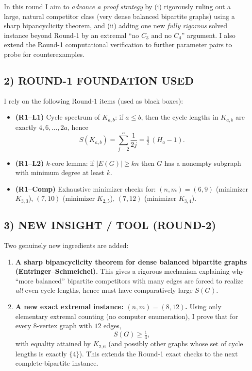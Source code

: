 In this round I aim to \emph{advance a proof strategy} by (i) rigorously ruling out a large, natural competitor class (very dense balanced bipartite graphs) using a sharp bipancyclicity theorem, and (ii) adding one new \emph{fully rigorous} solved instance beyond Round-1 by an extremal ``no $C_3$ and no $C_4$'' argument. I also extend the Round-1 computational verification to further parameter pairs to probe for counterexamples.

\subsection*{2) \textbf{ROUND-1 FOUNDATION USED}}
I rely on the following Round-1 items (used as black boxes):
\begin{itemize}
\item \textbf{(R1--L1)} Cycle spectrum of $K_{a,b}$: if $a\le b$, then the cycle lengths in $K_{a,b}$ are exactly $4,6,\dots,2a$, hence
\[S(K_{a,b})=\sum_{j=2}^{a}\frac{1}{2j}=\tfrac12\,(H_a-1).\]
\item \textbf{(R1--L2)} $k$-core lemma: if $|E(G)|\ge kn$ then $G$ has a nonempty subgraph with minimum degree at least $k$.
\item \textbf{(R1--Comp)} Exhaustive minimizer checks for:
$(n,m)=(6,9)$ (minimizer $K_{3,3}$), $(7,10)$ (minimizer $K_{2,5}$), $(7,12)$ (minimizer $K_{3,4}$).
\end{itemize}

\subsection*{3) \textbf{NEW INSIGHT / TOOL (ROUND-2)}}
Two genuinely new ingredients are added:
\begin{enumerate}
\item \textbf{A sharp bipancyclicity theorem for dense balanced bipartite graphs (Entringer--Schmeichel).}
This gives a rigorous mechanism explaining why ``more balanced'' bipartite competitors with many edges are forced to realize \emph{all} even cycle lengths, hence must have comparatively large $S(G)$.
\item \textbf{A new exact extremal instance: $(n,m)=(8,12)$.}
Using only elementary extremal counting (no computer enumeration), I prove that for every $8$-vertex graph with $12$ edges,
\[S(G)\ge \tfrac14,\]
with equality attained by $K_{2,6}$ (and possibly other graphs whose set of cycle lengths is exactly $\{4\}$).
This extends the Round-1 exact checks to the next complete-bipartite instance.
\end{enumerate}

